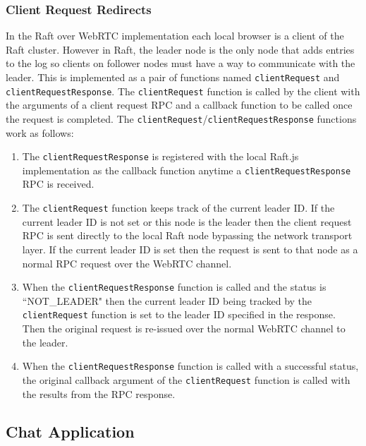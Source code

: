 \documentclass[conference,compsoc]{./IEEEtran/IEEEtran}
\begin{document}
\subsubsection{Client Request Redirects}


In the Raft over WebRTC implementation each local browser is a client
of the Raft cluster. However in Raft, the leader node is the only node
that adds entries to the log so clients on follower nodes must have
a way to communicate with the leader. This is implemented as a pair of
functions named \texttt{clientRequest} and
\texttt{clientRequestResponse}. The \texttt{clientRequest} function is
called by the client with the arguments of a client request RPC and
a callback function to be called once the request is completed. The
\texttt{clientRequest}/\texttt{clientRequestResponse} functions work
as follows:

\begin{enumerate}
\item The \texttt{clientRequestResponse} is registered with the local
    Raft.js implementation as the callback function anytime
    a \texttt{clientRequestResponse} RPC is received.
\item The \texttt{clientRequest} function keeps track of the current
    leader ID.  If the current leader ID is not set or this node is
    the leader then the client request RPC is sent directly to the
    local Raft node bypassing the network transport layer.  If the
    current leader ID is set then the request is sent to that node as
    a normal RPC request over the WebRTC channel.
\item When the \texttt{clientRequestResponse} function is called and
    the status is ``NOT\_LEADER" then the current leader ID being
    tracked by the \texttt{clientRequest} function is set to the
    leader ID specified in the response. Then the original request is
    re-issued over the normal WebRTC channel to the leader.
\item When the \texttt{clientRequestResponse} function is called with
    a successful status, the original callback argument of the
    \texttt{clientRequest} function is called with the results from
    the RPC response.
\end{enumerate}

\subsection{Chat Application}
\end{document}
